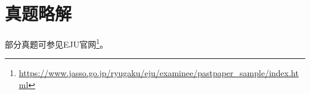 
\chapter{真题略解}

部分真题可参见EJU官网\footnote{\url{https://www.jasso.go.jp/ryugaku/eju/examinee/pastpaper_sample/index.html}}。












